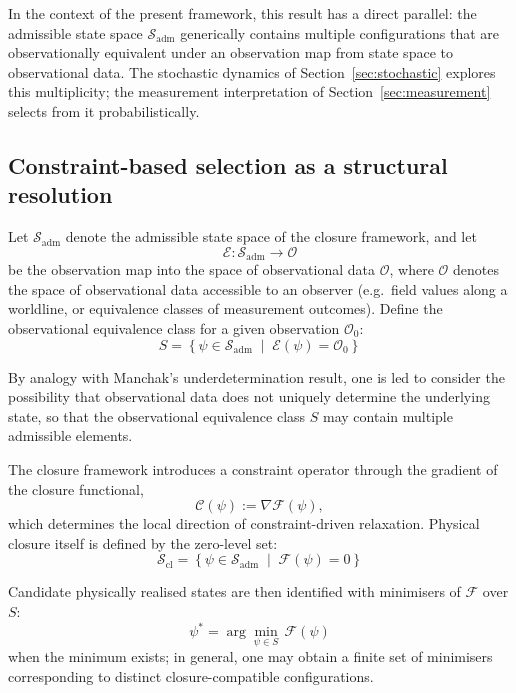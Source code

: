 \documentclass[12pt]{article}
\newcommand{\Ccal}{\mathcal{C}}
\newcommand{\Fcal}{\mathcal{F}}
\newcommand{\Sadm}{\mathcal{S}_{\mathrm{adm}}}
\newcommand{\Scl}{\mathcal{S}_{\mathrm{cl}}}
\begin{document}
In the context of the present framework, this result has a direct parallel: the admissible state space $\Sadm$ generically contains multiple configurations that are observationally equivalent under an observation map from state space to observational data. The stochastic dynamics of Section~\ref{sec:stochastic} explores this multiplicity; the measurement interpretation of Section~\ref{sec:measurement} selects from it probabilistically.

\subsection{Constraint-based selection as a structural resolution}

Let $\Sadm$ denote the admissible state space of the closure framework, and let
\begin{equation}
    \mathcal{E} : \Sadm \to \mathcal{O}
\end{equation}
be the observation map into the space of observational data $\mathcal{O}$, where $\mathcal{O}$ denotes the space of observational data accessible to an observer (e.g.\ field values along a worldline, or equivalence classes of measurement outcomes). Define the observational equivalence class for a given observation $\mathcal{O}_0$:
\begin{equation}
    S = \left\{\psi \in \Sadm \;\middle|\; \mathcal{E}(\psi) = \mathcal{O}_0\right\}
\end{equation}

By analogy with Manchak's underdetermination result, one is led to consider the possibility that observational data does not uniquely determine the underlying state, so that the observational equivalence class $S$ may contain multiple admissible elements.

The closure framework introduces a constraint operator through the gradient of the closure functional,
\begin{equation}
    \Ccal(\psi) := \nabla\Fcal(\psi),
\end{equation}
which determines the local direction of constraint-driven relaxation. Physical closure itself is defined by the zero-level set:
\begin{equation}
    \Scl = \left\{\psi \in \Sadm \;\middle|\; \Fcal(\psi) = 0\right\}
\end{equation}

Candidate physically realised states are then identified with minimisers of $\Fcal$ over $S$:
\begin{equation}
    \psi^* = \arg\min_{\psi \in S}\, \Fcal(\psi)
\end{equation}
when the minimum exists; in general, one may obtain a finite set of minimisers corresponding to distinct closure-compatible configurations.
\end{document}
